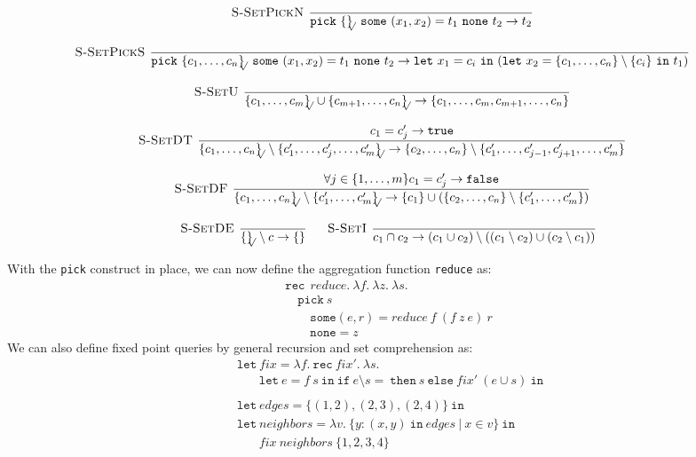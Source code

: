 \documentclass[a4paper]{article}
\newcommand{\code}[1]{{\tt #1}}
\newcommand{\pipe}{\ | \ }
\newcommand{\s}[1]{\mathtt{#1}}
\newcommand{\sLb}{\s{\{}}
\newcommand{\sRb}{\s{\}}}
\newcommand{\sif}{\s{if\ }}
\newcommand{\sthen}{\s{\ then\ }}
\newcommand{\selse}{\s{\ else\ }}
\newcommand{\spick}[3]{\s{pick}\ #1\ \s{some}\ #2\ \s{none}\ #3}
\newcommand{\slet}{\s{\ let\ }}
\newcommand{\sletin}[2]{\s{let\ } #1 \s{\ in\ } #2}
\newcommand{\srec}{\s{rec\ }}
\newcommand{\strue}{\s{true}}
\newcommand{\sfalse}{\s{false}}
\newcommand{\sset}[1]{\sLb #1 \sRb}
\newcommand{\ssetc}[1]{\sset{#1}_{\!\!\!\surd}}
\newcommand{\step}{\to}
\newcommand{\dotset}[2]{\{#1,\ldots,#2\}}
\renewcommand{\rule}[3][]{\ \mbox{\textsc{#1 }}\dfrac{#2}{#3}\ }
\begin{document}
\[\begin{array}{c}
\rule[S-SetPickN]{}{\spick{\ssetc{}}{(x_1,x_2) = t_1}{t_2} \step t_2}
\quad\\\\
\rule[S-SetPickS]{}{\spick{\ssetc{c_1,\ldots,c_n}}{(x_1,x_2) = t_1}{t_2} \step \sletin{x_1 = c_i}{(\sletin{x_2 = \sset{c_1,\ldots,c_n}\setminus\sset{c_i}}{t_1}})}
\quad\\\\
\rule[S-SetU]{}{\ssetc{c_1,\ldots,c_m} \cup \ssetc{c_{m+1},\ldots,c_n} \step
\{c_1,\ldots,c_m,c_{m+1},\ldots,c_n\}}
\quad\\\\
\rule[S-SetDT]{c_1 = c'_j \step \strue}
{\ssetc{c_1,\ldots,c_n} \setminus \ssetc{c'_1,\ldots,c'_j,\ldots,c'_m} \step
  \sset{c_2,\ldots,c_n} \setminus \sset{c'_1,\ldots,c'_{j-1},c'_{j+1},\ldots,c'_m}
}
\quad\\\\
\rule[S-SetDF]{\forall j \in \dotset{1}{m} c_1 = c'_j \step \sfalse}
{\ssetc{c_1,\ldots,c_n} \setminus \ssetc{c'_1,\ldots,c'_m} \step
  \sset{c_1} \cup (\sset{c_2,\ldots,c_n} \setminus \sset{c'_1,\ldots,c'_m})
}
\quad\\\\
\rule[S-SetDE]{}{\ssetc{} \setminus c \step \sset{}}
\quad
\rule[S-SetI]{}{c_1 \cap c_2 \step (c_1 \cup c_2) \setminus ((c_1 \setminus c_2) \cup (c_2 \setminus c_1))}
\end{array}\]


With the \code{pick} construct in place, we can now define the aggregation function \code{reduce} as:
\[\begin{array}{l}
\srec \  reduce.\ \lambda f.\ \lambda z.\ \lambda s.\\ 
\quad \s{pick} \ s \\
\quad\quad \s{some} (e,r) = reduce \ f \ (f \  z \  e)\ r\\
\quad\quad \s{none} = z
\end{array}\]
We can also define fixed point queries by general recursion and set comprehension as:
\[\begin{array}{l}
\slet fix = \lambda f.\ \srec fix'.\ \lambda s.\\
\quad\quad\sletin{e = f\ s}{\sif e \setminus s = {} \sthen s \selse fix'\ (e \cup s)}\s{\ in} \\
\\
\slet edges = \{(1, 2), (2, 3), (2, 4)\} \s{\ in}\\
\slet neighbors = \lambda v.\ \sLb y : (x,y) \s{\ in\ } edges \pipe x\in v \sRb\ \s{in} \\
\quad\quad fix\ neighbors\  \{1, 2, 3, 4\}
\end{array}\]
\end{document}
